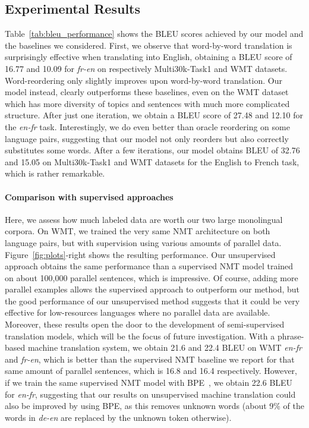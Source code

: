 \subsection{Experimental Results} \label{sec:results}

Table~\ref{tab:bleu_performance} shows the BLEU scores achieved by our model and the baselines we considered. First, we observe that word-by-word translation is surprisingly effective when translating into English, obtaining a BLEU score of 16.77 and 10.09 for \textit{fr-en} on respectively Multi30k-Task1 and WMT datasets. Word-reordering only slightly improves upon word-by-word translation. Our model instead, clearly outperforms these baselines, even on the WMT dataset which has more diversity of topics and sentences with much more complicated structure. After just one iteration, we obtain a BLEU score of 27.48 and 12.10 for the \textit{en-fr} task. Interestingly, we do even better than oracle reordering on some language pairs, suggesting that our model not only reorders but also correctly substitutes some words. After a few iterations, our model obtains BLEU of 32.76 and 15.05 on Multi30k-Task1 and WMT datasets for the English to French task, which is rather remarkable.

\paragraph{Comparison with supervised approaches} Here, we assess how much labeled data are worth our two large monolingual corpora. On WMT, we trained the very same NMT architecture on both language pairs, but with supervision using various amounts of parallel data. 
Figure~\ref{fig:plots}-right shows the resulting performance. Our unsupervised approach obtains the same performance than a supervised NMT model trained on about 100,000 parallel sentences, which is impressive. Of course, adding more parallel examples allows the supervised approach to outperform our method, but the good performance of our unsupervised method suggests that it could be very effective for low-resources languages where no parallel data are available. Moreover, these results open the door to the development of semi-supervised translation models, which will be the focus of future investigation.
With a phrase-based machine translation system, we obtain 21.6 and 22.4 BLEU on WMT \textit{en-fr} and \textit{fr-en}, which is better than the supervised NMT baseline we report for that same amount of parallel sentences, which is 16.8 and 16.4 respectively. However, if we train the same supervised NMT model with BPE~\citep{sennrich2015neural}, we obtain 22.6 BLEU for \textit{en-fr}, suggesting that our results on unsupervised machine translation could also be improved by using BPE, as this removes unknown words (about 9\% of the words in \textit{de-en} are replaced by the unknown token otherwise).

